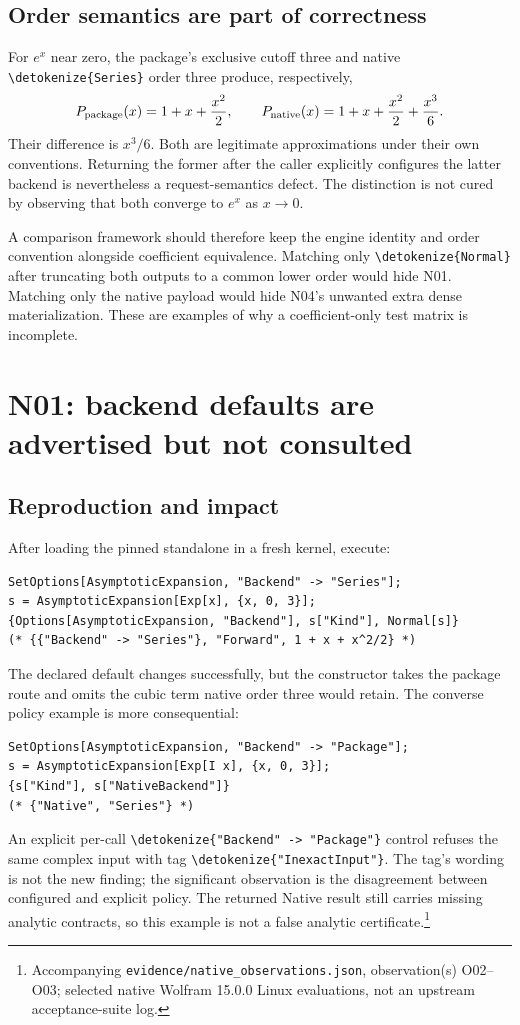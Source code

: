 \documentclass[11pt]{article}
\newcommand{\code}[1]{{\ttfamily\expandafter\nolinkurl\expandafter{\detokenize{#1}}}}
\newcommand{\obs}[1]{\footnote{Accompanying \nolinkurl{evidence/native_observations.json}, observation(s) #1; selected native Wolfram 15.0.0 Linux evaluations, not an upstream acceptance-suite log.}}
\begin{document}
\subsection{Order semantics are part of correctness}
For $e^x$ near zero, the package's exclusive cutoff three and native \code{Series} order three produce, respectively,
\[
 P_{\rm package}(x)=1+x+\frac{x^2}{2},\qquad
 P_{\rm native}(x)=1+x+\frac{x^2}{2}+\frac{x^3}{6}.
\]
Their difference is $x^3/6$. Both are legitimate approximations under their own conventions. Returning the former after the caller explicitly configures the latter backend is nevertheless a request-semantics defect. The distinction is not cured by observing that both converge to $e^x$ as $x\to0$.

A comparison framework should therefore keep the engine identity and order convention alongside coefficient equivalence. Matching only \code{Normal} after truncating both outputs to a common lower order would hide N01. Matching only the native payload would hide N04's unwanted extra dense materialization. These are examples of why a coefficient-only test matrix is incomplete.

\section{N01: backend defaults are advertised but not consulted}
\label{sec:n01}

\subsection{Reproduction and impact}
After loading the pinned standalone in a fresh kernel, execute:
\begin{lstlisting}
SetOptions[AsymptoticExpansion, "Backend" -> "Series"];
s = AsymptoticExpansion[Exp[x], {x, 0, 3}];
{Options[AsymptoticExpansion, "Backend"], s["Kind"], Normal[s]}
(* {{"Backend" -> "Series"}, "Forward", 1 + x + x^2/2} *)
\end{lstlisting}
The declared default changes successfully, but the constructor takes the package route and omits the cubic term native order three would retain. The converse policy example is more consequential:
\begin{lstlisting}
SetOptions[AsymptoticExpansion, "Backend" -> "Package"];
s = AsymptoticExpansion[Exp[I x], {x, 0, 3}];
{s["Kind"], s["NativeBackend"]}
(* {"Native", "Series"} *)
\end{lstlisting}
An explicit per-call \code{"Backend" -> "Package"} control refuses the same complex input with tag \code{"InexactInput"}. The tag's wording is not the new finding; the significant observation is the disagreement between configured and explicit policy. The returned Native result still carries missing analytic contracts, so this example is not a false analytic certificate.\obs{O02--O03}
\end{document}
